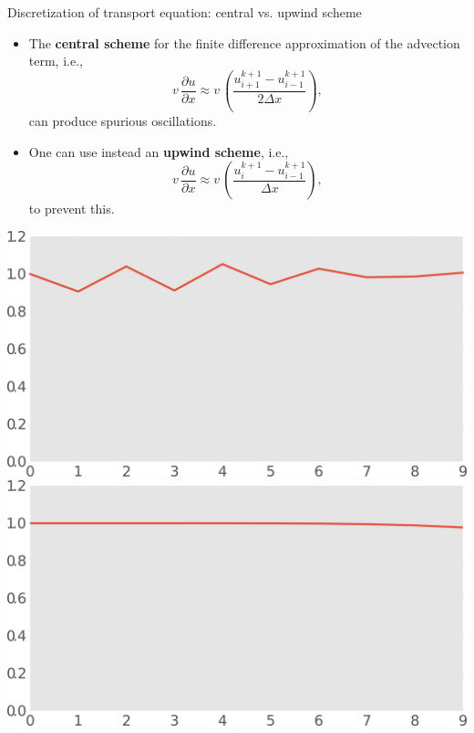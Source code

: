 \begin{frame}{Discretization of transport equation: central vs. upwind scheme}

\lcol
\begin{itemize}
\item The \alert{\bf central scheme} for the finite difference approximation
of the advection term, i.e., 
\[
v\, \frac{\partial u}{\partial x}\approx 
v\, \left(\frac{u_{i+1}^{k+1}-u_{i-1}^{k+1}}{2\Delta x}\right),
\]
can produce \alert{spurious oscillations}.
%
\item One can use instead an \alert{\bf upwind scheme}, i.e., 
\[
v\, \frac{\partial u}{\partial x}\approx 
v\, \left(\frac{u_{i}^{k+1}-u_{i-1}^{k+1}}{\Delta x}\right),
\]
to prevent this. 

\end{itemize}
\rcol
\begin{center}
\includegraphics[width=0.8\columnwidth]{figures/reactive-transport//advection-central-scheme-oscillation} \\[5pt]
\includegraphics[width=0.8\columnwidth]{figures/reactive-transport//advection-upwind-scheme-no-oscillation}
\par\end{center}

\ecol
\end{frame}
